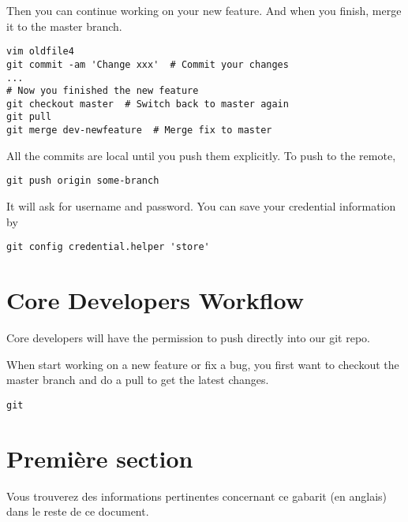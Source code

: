 \documentclass[runningheads,letterpaper]{llncs}
\begin{document}
Then you can continue working on your new feature.
And when you finish, merge it to the master branch.
\begin{verbatim}
vim oldfile4
git commit -am 'Change xxx'  # Commit your changes
...
# Now you finished the new feature
git checkout master  # Switch back to master again
git pull
git merge dev-newfeature  # Merge fix to master
\end{verbatim}

All the commits are local until you push them explicitly.
To push to the remote,
\begin{verbatim}
git push origin some-branch
\end{verbatim}
It will ask for username and password.
You can save your credential information by
\begin{verbatim}
git config credential.helper 'store'
\end{verbatim}

\section{Core Developers Workflow}

Core developers will have the permission to push directly into our git repo.

When start working on a new feature or fix a bug, you first want to checkout the master branch and do a pull to get the latest changes.
\begin{verbatim}
git

\end{verbatim}


\section{Première section}

Vous trouverez des informations pertinentes concernant ce gabarit (en anglais)
dans le reste de ce document.
\end{document}
